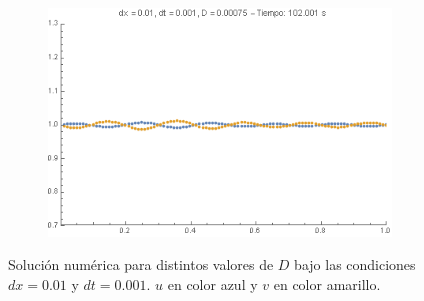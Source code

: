 \documentclass[aps,prb,twocolumn,superscriptaddress,floatfix,longbibliography]{revtex4-2}
\newcounter{para}
\begin{document}
\begin{figure}[h]
\begin{subfigure}[b]{0.3\textwidth}
         \caption{\label{fig:D_0.001}}
     \end{subfigure}
     \hfill
     \begin{subfigure}[b]{0.3\textwidth}
         \centering
         \includegraphics[width=\textwidth]{D_0.00075.png}
         \caption{\label{fig:D_0.00075}}
     \end{subfigure}
        \caption{Solución numérica para distintos valores de $D$ bajo las condiciones $dx = 0.01$ y $dt = 0.001$. $u$ en color azul y $v$ en color amarillo.}
        \label{fig:D_varios}
\end{figure}



\end{document}
